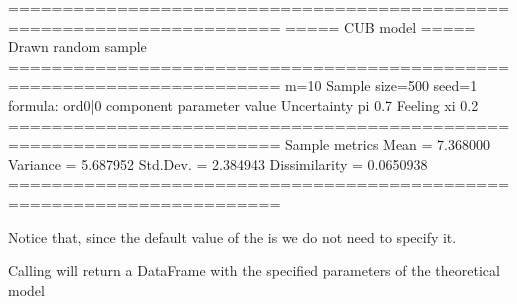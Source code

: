 \documentclass[letterpaper,10pt,english]{sphinxmanual}
\begin{document}
\begin{sphinxVerbatim}[commandchars=\\\{\}]
=======================================================================
=====\PYGZgt{}\PYGZgt{}\PYGZgt{} CUB model \PYGZlt{}\PYGZlt{}\PYGZlt{}===== Drawn random sample
=======================================================================
m=10  Sample size=500  seed=1
formula: ord\PYGZti{}0|0
\PYGZhy{}\PYGZhy{}\PYGZhy{}\PYGZhy{}\PYGZhy{}\PYGZhy{}\PYGZhy{}\PYGZhy{}\PYGZhy{}\PYGZhy{}\PYGZhy{}\PYGZhy{}\PYGZhy{}\PYGZhy{}\PYGZhy{}\PYGZhy{}\PYGZhy{}\PYGZhy{}\PYGZhy{}\PYGZhy{}\PYGZhy{}\PYGZhy{}\PYGZhy{}\PYGZhy{}\PYGZhy{}\PYGZhy{}\PYGZhy{}\PYGZhy{}\PYGZhy{}\PYGZhy{}\PYGZhy{}\PYGZhy{}\PYGZhy{}\PYGZhy{}\PYGZhy{}\PYGZhy{}\PYGZhy{}\PYGZhy{}\PYGZhy{}\PYGZhy{}\PYGZhy{}\PYGZhy{}\PYGZhy{}\PYGZhy{}\PYGZhy{}\PYGZhy{}\PYGZhy{}\PYGZhy{}\PYGZhy{}\PYGZhy{}\PYGZhy{}\PYGZhy{}\PYGZhy{}\PYGZhy{}\PYGZhy{}\PYGZhy{}\PYGZhy{}\PYGZhy{}\PYGZhy{}\PYGZhy{}\PYGZhy{}\PYGZhy{}\PYGZhy{}\PYGZhy{}\PYGZhy{}\PYGZhy{}\PYGZhy{}\PYGZhy{}\PYGZhy{}\PYGZhy{}\PYGZhy{}
  component parameter  value
Uncertainty        pi    0.7
    Feeling        xi    0.2
=======================================================================
Sample metrics
Mean     = 7.368000
Variance = 5.687952
Std.Dev. = 2.384943
\PYGZhy{}\PYGZhy{}\PYGZhy{}\PYGZhy{}\PYGZhy{}\PYGZhy{}\PYGZhy{}\PYGZhy{}\PYGZhy{}\PYGZhy{}\PYGZhy{}\PYGZhy{}\PYGZhy{}\PYGZhy{}\PYGZhy{}\PYGZhy{}\PYGZhy{}\PYGZhy{}\PYGZhy{}\PYGZhy{}\PYGZhy{}\PYGZhy{}\PYGZhy{}\PYGZhy{}\PYGZhy{}\PYGZhy{}\PYGZhy{}\PYGZhy{}\PYGZhy{}\PYGZhy{}\PYGZhy{}\PYGZhy{}\PYGZhy{}\PYGZhy{}\PYGZhy{}\PYGZhy{}\PYGZhy{}\PYGZhy{}\PYGZhy{}\PYGZhy{}\PYGZhy{}\PYGZhy{}\PYGZhy{}\PYGZhy{}\PYGZhy{}\PYGZhy{}\PYGZhy{}\PYGZhy{}\PYGZhy{}\PYGZhy{}\PYGZhy{}\PYGZhy{}\PYGZhy{}\PYGZhy{}\PYGZhy{}\PYGZhy{}\PYGZhy{}\PYGZhy{}\PYGZhy{}\PYGZhy{}\PYGZhy{}\PYGZhy{}\PYGZhy{}\PYGZhy{}\PYGZhy{}\PYGZhy{}\PYGZhy{}\PYGZhy{}\PYGZhy{}\PYGZhy{}\PYGZhy{}
Dissimilarity = 0.0650938
=======================================================================
\end{sphinxVerbatim}

\noindent{}

\sphinxAtStartPar
Notice that, since the default value of the   is
 we do not need to specify it.

\sphinxAtStartPar
Calling  will return a DataFrame with
the specified parameters of the theoretical model
\end{document}
